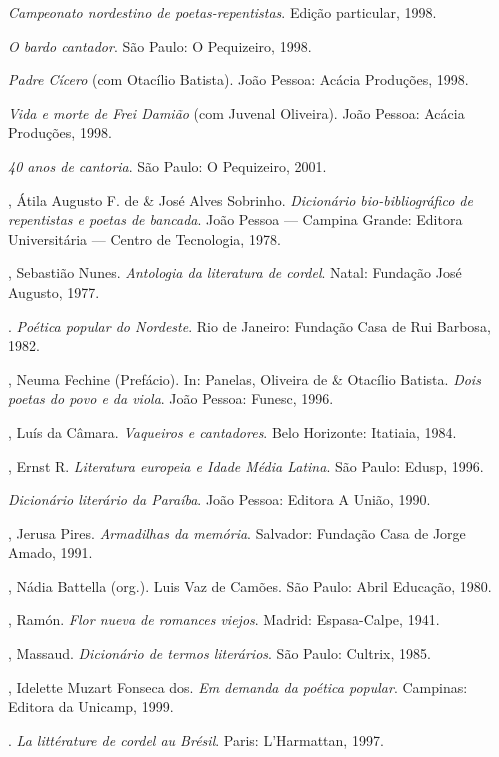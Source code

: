 \begin{bibliohedra}[]
\tit{}\textit{Campeonato nordestino de poetas-repentistas}. Edição particular, 1998.

\tit{}\textit{O bardo cantador}. São Paulo: O Pequizeiro, 1998.

\tit{}\textit{Padre Cícero }(com Otacílio Batista). João Pessoa: Acácia Produções, 1998.

\tit{}\textit{Vida e morte de Frei Damião} (com Juvenal Oliveira). João Pessoa: Acácia Produções, 1998.

\tit{}\textit{40 anos de cantoria}. São Paulo: O Pequizeiro, 2001.


\bigskip
{}


, Átila Augusto F. de \& José Alves Sobrinho. \textit{Dicionário bio-bibliográfico de repentistas e poetas de
bancada}. João Pessoa --- Campina Grande: Editora Universitária --- Centro de Tecnologia, 1978.

, Sebastião Nunes. \textit{Antologia da literatura de cordel}. Natal: Fundação José Augusto, 1977.

\titidem. \textit{Poética popular do Nordeste}.  Rio de Janeiro: Fundação Casa de Rui Barbosa, 1982.

, Neuma Fechine (Prefácio). In: Panelas, Oliveira de \& Otacílio Batista. \textit{Dois poetas do povo e da viola}.
João Pessoa: Funesc, 1996.

, Luís da Câmara. \textit{Vaqueiros e cantadores}. Belo Horizonte: Itatiaia, 1984.

, Ernst R. \textit{Literatura europeia e Idade Média Latina}. São Paulo: Edusp, 1996.

\tit{}\textit{Dicionário literário da Paraíba}. João Pessoa: Editora A União, 1990.

, Jerusa Pires. \textit{Armadilhas da memória}. Salvador: Fundação Casa de Jorge Amado, 1991.

, Nádia Battella (org.). Luis Vaz de Camões. São Paulo: Abril Educação, 1980.

, Ramón. \textit{Flor nueva de romances viejos}. Madrid: Espasa-Calpe, 1941.

, Massaud. \textit{Dicionário de termos literários}. São Paulo: Cultrix, 1985.

, Idelette Muzart Fonseca dos. \textit{Em demanda da poética popular}. Campinas: Editora da Unicamp, 1999.

\titidem. \textit{La littérature de cordel au Brésil}. Paris: L'Harmattan, 1997.


\end{bibliohedra}

